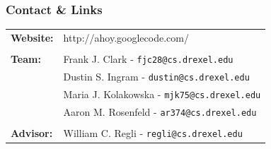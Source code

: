 \documentclass[mathserif,usenames,dvipsnames]{beamer}
\begin{document}
\frame
{
    \frametitle{Contact \& Links}
    \begin{tabular}{l l}
        \textbf{Website:} & http://ahoy.googlecode.com/ \\
        & \\
        \textbf{Team:} & Frank J. Clark - \texttt{fjc28@cs.drexel.edu} \\
        & Dustin S. Ingram - \texttt{dustin@cs.drexel.edu} \\
        & Maria J. Kolakowska - \texttt{mjk75@cs.drexel.edu} \\
        & Aaron M. Rosenfeld - \texttt{ar374@cs.drexel.edu} \\
        & \\
        \textbf{Advisor:} & William C. Regli - \texttt{regli@cs.drexel.edu} \\
    \end{tabular}
    \begin{center}
    \begin{tabular}{c c c c c}

\end{tabular}
\end{center}}
\end{document}
